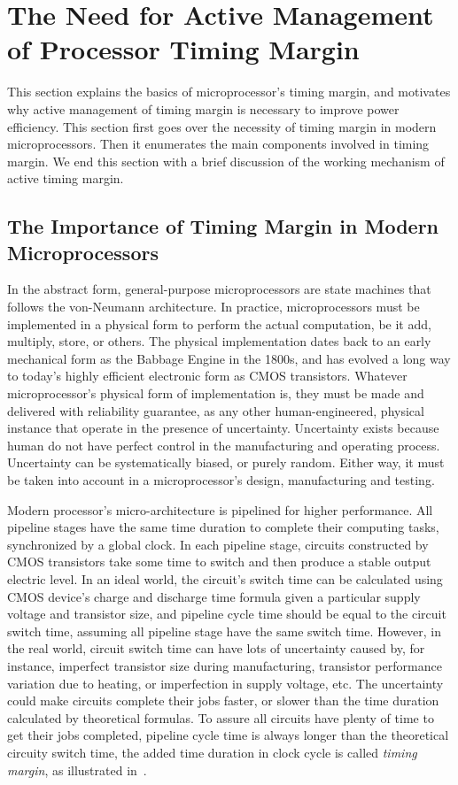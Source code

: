 
\section{The Need for Active Management of Processor Timing Margin}
\label{sec:motivation}

This section explains the basics of microprocessor's timing margin, and motivates why active management of timing margin is necessary to improve power efficiency. This section first goes over the necessity of timing margin in modern microprocessors. Then it enumerates the main components involved in timing margin. We end this section with a brief discussion of the working mechanism of active timing margin.

\subsection{The Importance of Timing Margin in Modern Microprocessors}

In the abstract form, general-purpose microprocessors are state machines that follows the von-Neumann architecture. In practice, microprocessors must be implemented in a physical form to perform the actual computation, be it add, multiply, store, or others. The physical implementation dates back to an early mechanical form as the Babbage Engine in the 1800s, and has evolved a long way to today's highly efficient electronic form as CMOS transistors. Whatever microprocessor's physical form of implementation is, they must be made and delivered with reliability guarantee, as any other human-engineered, physical instance that operate in the presence of uncertainty. Uncertainty exists because human do not have perfect control in the manufacturing and operating process. Uncertainty can be systematically biased, or purely random. Either way, it must be taken into account in a microprocessor's design, manufacturing and testing.

Modern processor's micro-architecture is pipelined for higher performance. All pipeline stages have the same time duration to complete their computing tasks, synchronized by a global clock. In each pipeline stage, circuits constructed by CMOS transistors take some time to switch and then produce a stable output electric level. In an ideal world, the circuit's switch time can be calculated using CMOS device's charge and discharge time formula given a particular supply voltage and transistor size, and pipeline cycle time should be equal to the circuit switch time, assuming all pipeline stage have the same switch time. However, in the real world, circuit switch time can have lots of uncertainty caused by, for instance, imperfect transistor size during manufacturing, transistor performance variation due to heating, or imperfection in supply voltage, etc. The uncertainty could make circuits complete their jobs faster, or slower than the time duration calculated by theoretical formulas. To assure all circuits have plenty of time to get their jobs completed, pipeline cycle time is always longer than the theoretical circuity switch time, the added time duration in clock cycle is called \textit{timing margin}, as illustrated in~.

